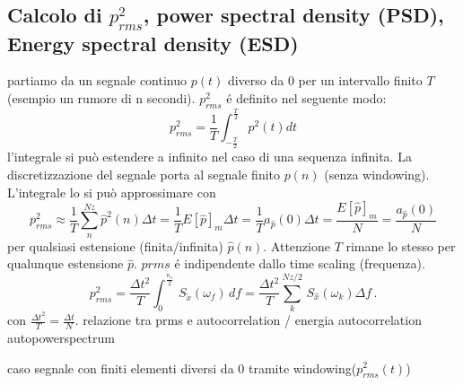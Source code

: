 \documentclass[11pt,a4paper,DIV12,BCOR1.5mm]{scrartcl}
\begin{document}
\subsection{Calcolo di $p_{rms}^2$, power spectral density (PSD), Energy spectral density (ESD) }
partiamo da un segnale continuo $p(t)$ diverso da 0 per un intervallo finito $T$ (esempio un rumore di n secondi). $p_{rms}^2$ é definito  nel seguente modo:
\begin{equation}
	p_{rms}^2 = \frac{1}{T} \int_{-\frac{T}{2}}^{\frac{T}{2}} p^2(t) dt 
\end{equation}
l'integrale si può estendere a infinito nel caso di una sequenza infinita. La discretizzazione del segnale porta al segnale finito $p(n)$ (senza windowing). L'integrale lo si può approssimare con 
\begin{equation}
p_{rms}^2 \approx \frac{1}{T} \sum_{n}^{Nz} \hat{p}^2(n) \Delta t = \frac{1}{T} E[\hat p]_m \Delta t = \frac{1}{T} a_{\hat{p}}(0) \Delta t = \frac{E[\hat p]_m}{N}= \frac{a_{\hat{p}}(0)}{N} 
\end{equation}
per qualsiasi  estensione (finita/infinita) $\hat p(n)$. Attenzione $T$ rimane lo stesso per qualunque estensione $\hat p$. $prms$ é indipendente dallo time scaling (frequenza).
\begin{equation}
p_{rms}^2  = \frac{\Delta t^2}{T}\int_0^\frac{n_s}{2}\,S_{\tilde{x}}(\omega_f)\,df = \frac{\Delta t^2}{T}\sum_k^{Nz/2}\,S_{\hat{x}}(\omega_k)\Delta f\,.
\end{equation}
con $\frac{\Delta t^2}{T} = \frac{\Delta t}{N}$.
relazione tra prms e autocorrelation / energia
autocorrelation
autopowerspectrum

caso segnale con finiti elementi diversi da 0 tramite windowing($p_{rms}^2(t)$)
\end{document}

